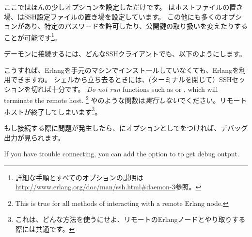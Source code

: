 ここではほんの少しオプションを設定しただけです。
はホストファイルの置き場、はSSH設定ファイルの置き場を設定しています。
この他にも多くのオプションがあり、特定のパスワードを許可したり、公開鍵の取り扱いを変えたりすることが可能です\footnote{詳細な手順とすべてのオプションの説明は \href{http://www.erlang.org/doc/man/ssh.html\#daemon-3}{http://www.erlang.org/doc/man/ssh.html\#daemon-3}参照。}。%


デーモンに接続するには、どんなSSHクライアントでも、以下のようにします。


こうすれば、Erlangを手元のマシンでインストールしていなくても、Erlangを利用できますね。
シェルから立ち去るときには、(ターミナルを閉じて）SSHセッションを切れば十分です。
\emph{Do not run} functions such as  or , which will terminate the remote host.
\footnote{This is true for all methods of interacting with a remote Erlang node.}
やのような関数は\emph{実行しない}でください。リモートホストが終了してしまいます\footnote{これは、どんな方法を使うにせよ、リモートのErlangノードとやり取りする際には共通です。}。

もし接続する際に問題が発生したら、にオプションとしてをつければ、デバッグ出力が見られます。

If you have trouble connecting, you can add the  option to  to get debug output.

